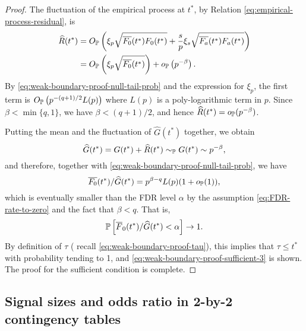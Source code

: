 \begin{proof}
The fluctuation of the empirical process at $t^*$, by Relation \eqref{eq:empirical-process-residual}, is 
\begin{align*}
    \widehat{R}(t^*) 
    &= O_\P\left(\xi_p\sqrt{\overline{F_0}(t^*)F_0(t^*)} + \frac{s}{p}\xi_s\sqrt{\overline{F_a}(t^*)F_a(t^*)}\right)\\
    &= O_\P\left(\xi_p\sqrt{\overline{F_0}(t^*)}\right) + o_\P\left(p^{-\beta}\right).
\end{align*}
By \eqref{eq:weak-boundary-proof-null-tail-prob} and the expression for $\xi_p$, the first term is $O_\P\left(p^{-(q+1)/2}L(p)\right)$ where $L(p)$ is a poly-logarithmic term in $p$.
Since $\beta<\min\{q,1\}$, we have $\beta<(q+1)/2$, and hence $\widehat{R}(t^*) = o_\P(p^{-\beta})$.

Putting the mean and the fluctuation of $\widehat{G}(t^*)$ together, we obtain
$$
\widehat{G}(t^*) = G(t^*) + \widehat{R}(t^*) \sim_\P G(t^*) \sim p^{-\beta},
$$
and therefore, together with \eqref{eq:weak-boundary-proof-null-tail-prob}, we have
$$
\overline{F_0}(t^*)/\widehat{G}(t^*) = p^{\beta-q}L(p)(1+o_{\P}(1)),
$$
which is eventually smaller than the FDR level $\alpha$ by the assumption \eqref{eq:FDR-rate-to-zero} and the fact that $\beta<q$.
That is, 
$$
\P\left[\overline{F}_0(t^*) / \widehat{G}(t^*) < \alpha\right] \to 1.
$$
By definition of $\tau$ ( recall \eqref{eq:weak-boundary-proof-tau}), this implies that $\tau \le t^*$ with probability tending to 1, and \eqref{eq:weak-boundary-proof-sufficient-3} is shown.
The proof for the sufficient condition is complete.
\end{proof}

\subsection{Signal sizes and odds ratio in 2-by-2 contingency tables}

